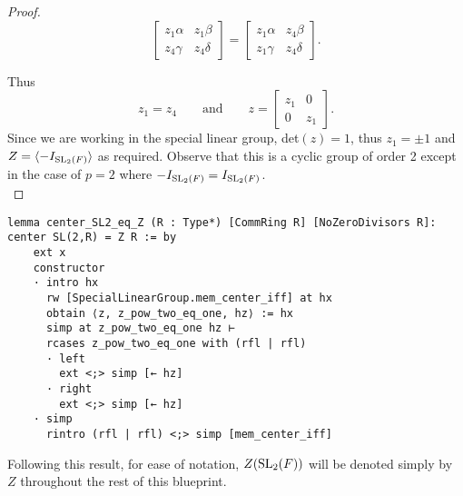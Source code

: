 \begin{proof}
\begin{equation*} \begin{bmatrix} z_1 \alpha & z_1 \beta \\ z_4 \gamma & z_4 \delta \end{bmatrix} = \begin{bmatrix} z_1 \alpha & z_4 \beta \\ z_1 \gamma & z_4 \delta \end{bmatrix}. \end{equation*}

Thus 
\begin{equation*} 
    z_1 = z_4 \qquad  \text{and} \qquad z =  
    \begin{bmatrix} z_1 & 0 \\ 0 & z_1 \end{bmatrix}. 
\end{equation*}
Since we are working in the special linear group, det$(z)=1$, thus $z_1 = \pm 1$ and $Z = \langle - I_{\operatorname{SL}_2(F)}\rangle$ as required. Observe that this is a cyclic group of order 2 except in the case of $p = 2$ where $- I_{\operatorname{SL}_2(F)} = I_{\operatorname{SL}_2(F)}$. \\
\end{proof}
\begin{footnotesize}
\begin{verbatim}
lemma center_SL2_eq_Z (R : Type*) [CommRing R] [NoZeroDivisors R]: center SL(2,R) = Z R := by
    ext x
    constructor
    · intro hx
      rw [SpecialLinearGroup.mem_center_iff] at hx
      obtain ⟨z, z_pow_two_eq_one, hz⟩ := hx
      simp at z_pow_two_eq_one hz ⊢
      rcases z_pow_two_eq_one with (rfl | rfl)
      · left
        ext <;> simp [← hz]
      · right
        ext <;> simp [← hz]
    · simp
      rintro (rfl | rfl) <;> simp [mem_center_iff]
\end{verbatim}
\end{footnotesize}

Following this result, for ease of notation, $Z(\operatorname{SL}_2(F))$ will be denoted simply by $Z$ throughout the rest of this blueprint.

